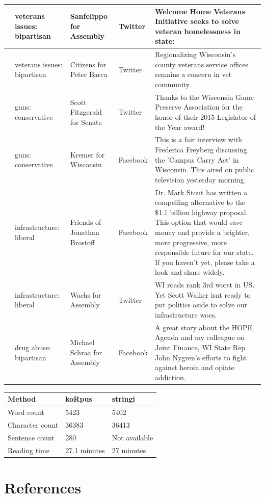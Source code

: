 \documentclass[12pt,]{article}
\begin{document}
\begin{longtable}[t]{>{\raggedright\arraybackslash}p{.65in}|>{\raggedright\arraybackslash}p{.6in}|>{\raggedright\arraybackslash}p{.7in}|>{\raggedright\arraybackslash}p{.6in}|>{\raggedright\arraybackslash}p{3in}}
\hline
6 & veterans issues: bipartisan & Sanfelippo for Assembly & Twitter & Welcome Home Veterans Initiative seeks to solve veteran homelessness in state:\\
\hline
7 & veterans issues: bipartisan & Citizens for Peter Barca & Twitter & Regionalizing Wisconsin's county veterans service offices remains a concern in vet community\\
\hline
8 & guns: conservative & Scott Fitzgerald for Senate & Twitter & Thanks to the Wisconsin Game Preserve Association for the honor of their 2015 Legislator of the Year award!\\
\hline
9 & guns: conservative & Kremer for Wisconsin & Facebook & This is a fair interview with Frederica Freyberg discussing the 'Campus Carry Act' in Wisconsin.  This aired on public television yesterday morning.\\
\hline
10 & infrastructure: liberal & Friends of Jonathan Brostoff & Facebook & Dr. Mark Stout has written a compelling alternative to the \$1.1 billion highway proposal. This option that would save money and provide a brighter, more progressive, more responsible future for our state. If you haven't yet, please take a look and share widely.\\
\hline
11 & infrastructure: liberal & Wachs for Assembly & Twitter & WI roads rank 3rd worst in US. Yet Scott Walker isnt ready to put politics aside to solve our infrastructure woes.\\
\hline
12 & drug abuse: bipartisan & Michael Schraa for Assembly & Facebook & A great story about the HOPE Agenda and my colleague on Joint Finance, WI State Rep John Nygren's efforts to fight against heroin and opiate addiction.\\
\hline
\end{longtable}

\begin{tabular}{l|l|l}
\hline
Method & koRpus & stringi\\
\hline
Word count & 5423 & 5402\\
\hline
Character count & 36383 & 36413\\
\hline
Sentence count & 280 & Not available\\
\hline
Reading time & 27.1 minutes & 27 minutes\\
\hline
\end{tabular}

\hypertarget{references}{%
\section*{References}\label{references}}
\end{document}
